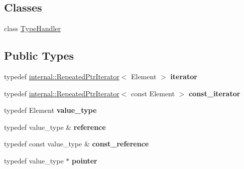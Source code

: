 \subsection*{Classes}
\begin{DoxyCompactItemize}
\item 
class \hyperlink{classgoogle_1_1protobuf_1_1RepeatedPtrField_1_1TypeHandler}{Type\+Handler}
\end{DoxyCompactItemize}
\subsection*{Public Types}
\begin{DoxyCompactItemize}
\item 
\mbox{\label{classgoogle_1_1protobuf_1_1RepeatedPtrField_a2846efabf8fd8831c5af4fdfa0325c85}} 
typedef \hyperlink{classgoogle_1_1protobuf_1_1internal_1_1RepeatedPtrIterator}{internal\+::\+Repeated\+Ptr\+Iterator}$<$ Element $>$ {\bfseries iterator}
\item 
\mbox{\label{classgoogle_1_1protobuf_1_1RepeatedPtrField_a5d911f8dec436d098c02a10c5502972b}} 
typedef \hyperlink{classgoogle_1_1protobuf_1_1internal_1_1RepeatedPtrIterator}{internal\+::\+Repeated\+Ptr\+Iterator}$<$ const Element $>$ {\bfseries const\+\_\+iterator}
\item 
\mbox{\label{classgoogle_1_1protobuf_1_1RepeatedPtrField_a3c7391f763fae60c7ddc200333dc6d27}} 
typedef Element {\bfseries value\+\_\+type}
\item 
\mbox{\label{classgoogle_1_1protobuf_1_1RepeatedPtrField_a17c41b4874464e1d4dd2cbf2bd970737}} 
typedef value\+\_\+type \& {\bfseries reference}
\item 
\mbox{\label{classgoogle_1_1protobuf_1_1RepeatedPtrField_aa99421b3924e8a2860c71d96b9a70d8c}} 
typedef const value\+\_\+type \& {\bfseries const\+\_\+reference}
\item 
\mbox{\label{classgoogle_1_1protobuf_1_1RepeatedPtrField_abcde50d892adaf6dc5654eb847cfb27d}} 
typedef value\+\_\+type $\ast$ {\bfseries pointer}

\end{DoxyCompactItemize}
